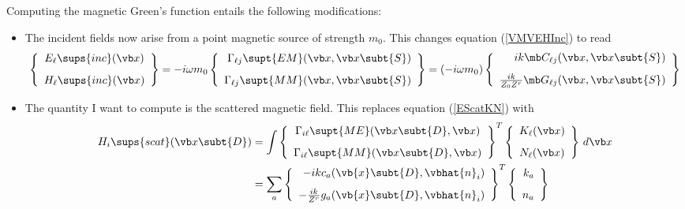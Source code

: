 \documentclass[letterpaper]{article}
\begin{document}
Computing the magnetic Green's function entails the following
modifications:
\begin{itemize}
 \item The incident fields now arise from a point magnetic source
       of strength $m_0$. This changes equation (\ref{VMVEHInc})
       to read
$$
 \left\{\begin{array}{c}
 E_\ell\sups{inc}(\vb x) \\[8pt]
 H_\ell\sups{inc}(\vb x)
 \end{array}\right\}
= -i\omega m_0
  \left\{\begin{array}{r}
   \Gamma_{\ell j}\supt{EM}(\vb x, \vb x\subt{S}) \\[8pt]
   \Gamma_{\ell j}\supt{MM}(\vb x, \vb x\subt{S})
  \end{array}\right\}
= (-i\omega m_0)
  \left\{\begin{array}{r}
     ik \mb C_{\ell j}(\vb x, \vb x\subt{S}) \\[8pt]
  \frac{ik}{Z_0 Z^r} \mb G_{\ell j}(\vb x, \vb x\subt{S})
  \end{array}\right\}
$$
 \item The quantity I want to compute is the scattered magnetic
       field. This replaces equation (\ref{EScatKN}) with
\begin{align}
 H_i\sups{scat}(\vb x\subt{D})
&=\int 
  \left\{\begin{array}{c}
   \Gamma_{i \ell}\supt{ME}(\vb x\subt{D}, \vb x) 
   \\[8pt]
   \Gamma_{i \ell}\supt{MM}(\vb x\subt{D}, \vb x) 
  \end{array}\right\}^T
  \left\{\begin{array}{c}
   K_\ell(\vb x) 
   \\[8pt]
   N_\ell(\vb x)
  \end{array}\right\}
  \, d\vb x
\\
&= \sum_{a}
  \left\{\begin{array}{r}
  -ik c_a(\vb {x}\subt{D}, \vbhat{n}_i)
   \\[8pt]
  -\frac{ik}{Z^r} g_a(\vb {x}\subt{D}, \vbhat{n}_i)
  \end{array}\right\}^T
  \left\{\begin{array}{r}
   k_a 
   \\[8pt]
   n_a
  \end{array}\right\}
\label{HScatKN}
\end{align}
\end{itemize}
\end{document}
